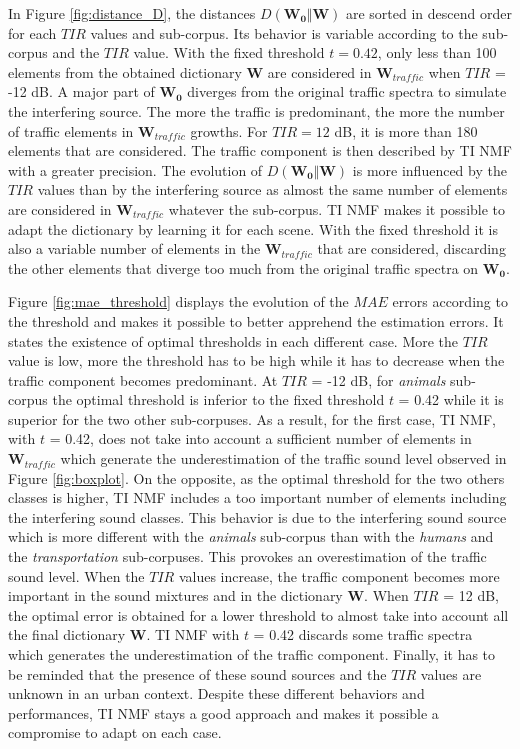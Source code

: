 \documentclass[12pt,english,twoside]{article}
\begin{document}
In Figure \ref{fig:distance_D}, the distances $D(\mathbf{W_0}\Vert \mathbf{W})$ are sorted in descend order for each $TIR$ values and sub-corpus. Its behavior is variable according to the sub-corpus and the $TIR$ value. 
With the fixed threshold $t = 0.42$, only less than 100 elements from the obtained dictionary $\mathbf{W}$ are considered in $\mathbf{W}_{traffic}$ when $TIR$ = -12 dB. A major part of $\mathbf{W_0}$ diverges from the original traffic spectra to simulate the interfering source. The more the traffic is predominant, the more the number of traffic elements in $\mathbf{W}_{traffic}$ growths. For $TIR = 12$ dB, it is more than 180 elements that are considered. The traffic component is then described by TI NMF with a greater precision. The evolution of $D(\mathbf{W_0}\Vert \mathbf{W})$ is more influenced by the $TIR$ values than by the interfering source as almost the same number of elements are considered in $\mathbf{W}_{traffic}$ whatever the sub-corpus.
TI NMF makes it possible to adapt the dictionary by learning it for each scene. With the fixed threshold it is also a variable number of elements in the $\mathbf{W}_{traffic}$ that are considered,  discarding the other elements that diverge too much from the original traffic spectra on $\mathbf{W_0}$.

Figure \ref{fig:mae_threshold} displays the evolution of the $MAE$ errors according to the threshold and makes it possible to better apprehend the estimation errors. It states the existence of optimal thresholds in each different case. More the $TIR$ value is low, more the threshold has to be high while it has to decrease when the traffic component becomes predominant.
At $TIR$ = -12 dB, for \textit{animals} sub-corpus the optimal threshold is inferior to the fixed threshold $t$ = 0.42 while it is superior for the two other sub-corpuses. As a result, for the first case, TI NMF, with $t$ = 0.42, does not take into account a sufficient number of elements in $\mathbf{W}_{traffic}$ which generate the underestimation of the traffic sound level observed in Figure \ref{fig:boxplot}. On the opposite, as the optimal threshold for the two others classes is higher, TI NMF includes a too important number of elements including the interfering sound classes. This behavior is due to the interfering sound source which is more different with the \textit{animals} sub-corpus than with the \textit{humans} and the \textit{transportation} sub-corpuses. This provokes an overestimation of the traffic sound level.
When the $TIR$ values increase, the traffic component becomes more important in the sound mixtures and in the dictionary $\mathbf{W}$. When $TIR$ = 12 dB, the optimal error is obtained for a lower threshold to almost take into account all the final dictionary $\mathbf{W}$. TI NMF with $t$ = 0.42 discards some traffic spectra which generates the underestimation of the traffic component.  Finally, it has to be reminded that the presence of these sound sources and the $TIR$ values are unknown in an urban context. Despite these different behaviors and performances, TI NMF stays a good approach and makes it possible a compromise to adapt on each case.
\end{document}
